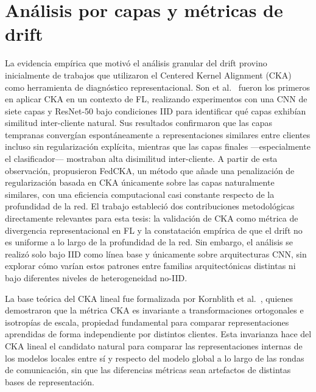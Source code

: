 \section{Análisis por capas y métricas de drift}

La evidencia empírica que motivó el análisis granular del drift provino inicialmente de trabajos
que utilizaron el Centered Kernel Alignment (CKA) como herramienta de diagnóstico representacional.
Son et al.\ \cite{son2022comparisons} fueron los primeros en aplicar CKA en un contexto de FL,
realizando experimentos con una CNN de siete capas y ResNet-50 bajo condiciones IID para identificar
qué capas exhibían similitud inter-cliente natural.
Sus resultados confirmaron que las capas tempranas convergían espontáneamente a representaciones
similares entre clientes incluso sin regularización explícita, mientras que las capas finales
---especialmente el clasificador--- mostraban alta disimilitud inter-cliente.
A partir de esta observación, propusieron FedCKA, un método que añade una penalización de
regularización basada en CKA únicamente sobre las capas naturalmente similares, con una eficiencia
computacional casi constante respecto de la profundidad de la red.
El trabajo estableció dos contribuciones metodológicas directamente relevantes para esta tesis:
la validación de CKA como métrica de divergencia representacional en FL y la constatación empírica
de que el drift no es uniforme a lo largo de la profundidad de la red.
Sin embargo, el análisis se realizó solo bajo IID como línea base y únicamente sobre arquitecturas
CNN, sin explorar cómo varían estos patrones entre familias arquitectónicas distintas ni bajo
diferentes niveles de heterogeneidad no-IID.

La base teórica del CKA lineal fue formalizada por Kornblith et al.\ \cite{DBLP:journals/corr/abs-1905-00414},
quienes demostraron que la métrica CKA es invariante a transformaciones ortogonales e isotropías de escala, propiedad fundamental para comparar representaciones aprendidas de forma independiente por distintos clientes.
Esta invarianza hace del CKA lineal el candidato natural para comparar las representaciones
internas de los modelos locales entre sí y respecto del modelo global a lo largo de las rondas de
comunicación, sin que las diferencias métricas sean artefactos de distintas bases de representación.

